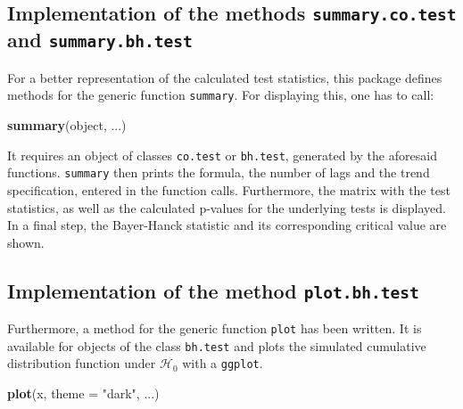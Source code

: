 \documentclass[11pt,a4paper]{article}
\newenvironment{Shaded}{\begin{snugshade}}{\end{snugshade}}
\newcommand{\DataTypeTok}[1]{\textcolor[rgb]{0.13,0.29,0.53}{#1}}
\newcommand{\KeywordTok}[1]{\textcolor[rgb]{0.13,0.29,0.53}{\textbf{#1}}}
\newcommand{\NormalTok}[1]{#1}
\newcommand{\StringTok}[1]{\textcolor[rgb]{0.31,0.60,0.02}{#1}}
\begin{document}
\hypertarget{implementation-of-the-methods-summary.co.test-and-summary.bh.test}{%
\subsection{\texorpdfstring{Implementation of the methods
\texttt{summary.co.test} and
\texttt{summary.bh.test}}{Implementation of the methods summary.co.test and summary.bh.test}}\label{implementation-of-the-methods-summary.co.test-and-summary.bh.test}}

For a better representation of the calculated test statistics, this
package defines methods for the generic function \texttt{summary}. For
displaying this, one has to call:

\begin{Shaded}
\begin{Highlighting}[]
\KeywordTok{summary}\NormalTok{(object, ...)}
\end{Highlighting}
\end{Shaded}

It requires an object of classes \texttt{co.test} or \texttt{bh.test},
generated by the aforesaid functions. \texttt{summary} then prints the
formula, the number of lags and the trend specification, entered in the
function calls. Furthermore, the matrix with the test statistics, as
well as the calculated p-values for the underlying tests is displayed.
In a final step, the Bayer-Hanck statistic and its corresponding
critical value are shown.

\hypertarget{implementation-of-the-method-plot.bh.test}{%
\subsection{\texorpdfstring{Implementation of the method
\texttt{plot.bh.test}}{Implementation of the method plot.bh.test}}\label{implementation-of-the-method-plot.bh.test}}

Furthermore, a method for the generic function \texttt{plot} has been
written. It is available for objects of the class \texttt{bh.test} and
plots the simulated cumulative distribution function under
\(\mathcal{H}_0\) with a \texttt{ggplot}.

\begin{Shaded}
\begin{Highlighting}[]
\KeywordTok{plot}\NormalTok{(x, }\DataTypeTok{theme =} \StringTok{"dark"}\NormalTok{, ...)}
\end{Highlighting}
\end{Shaded}
\end{document}
